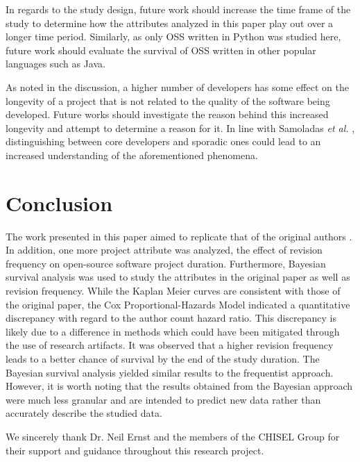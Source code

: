 \documentclass[sigconf]{acmart}
\begin{document}
In regards to the study design, future work should increase the time frame of the study to determine how the attributes analyzed in this paper play out over a longer time period. 
Similarly, as only OSS written in Python was studied here, future work should evaluate the survival of OSS written in other popular languages such as Java. 

As noted in the discussion, a higher number of developers has some effect on the longevity of a project that is not related to the quality of the software being developed. 
Future works should investigate the reason behind this increased longevity and attempt to determine a reason for it. 
In line with Samoladas \emph{et al.} \cite{samoladas2010survival}, distinguishing between core developers and sporadic ones could lead to an increased understanding of the aforementioned phenomena. 

\section{Conclusion} \label{conclusion}

The work presented in this paper aimed to replicate that of the original authors \cite{ali2020cheating}. 
In addition, one more project attribute was analyzed, the effect of revision frequency on open-source software project duration.
Furthermore, Bayesian survival analysis was used to study the attributes in the original paper as well as revision frequency.
While the Kaplan Meier curves are consistent with those of the original paper, the Cox Proportional-Hazards Model indicated a quantitative discrepancy with regard to the author count hazard ratio.
This discrepancy is likely due to a difference in methods which could have been mitigated through the use of research artifacts.
It was observed that a higher revision frequency leads to a better chance of survival by the end of the study duration. 
The Bayesian survival analysis yielded similar results to the frequentist approach.
However, it is worth noting that the results obtained from the Bayesian approach were much less granular and are intended to predict new data rather than accurately describe the studied data.

\begin{acks}
    We sincerely thank Dr. Neil Ernst and the members of the CHISEL Group for their support and guidance throughout this research project. 
\end{acks}
\balance


\end{document}
